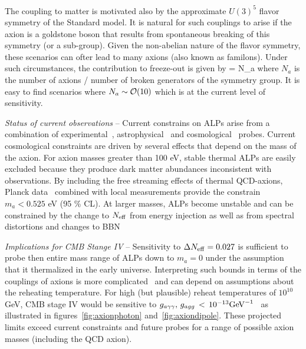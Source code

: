 The coupling to matter is motivated also by the approximate $U(3)^5$ flavor symmetry of the Standard model.  It is natural for such couplings to arise if the axion is a goldstone boson that results from spontaneous breaking of this symmetry (or a sub-group).  Given the non-abelian nature of the flavor symmetry, these scenarios can ofter lead to many axions (also known as familons).  Under such circumstances, the contribution to freeze-out is given by 
\beq
\Delta \Neff = N_a 
\eeq
where $N_a$ is the number of axions / number of broken generators of the symmetry group.  It is easy to find scenarios where $N_a\sim {\cal O}(10)$ which is at the current level of sensitivity.


{\it Status of current observations} -- Current constrains on ALPs arise from a combination of experimental~\cite{Graham:2015ouw}, astrophysical~\cite{Raffelt:2012kt} and cosmological~\cite{Marsh:2015xka} probes.  Current cosmological constraints are driven by several effects that depend on the mass of the axion.  For axion masses greater than 100 eV, stable thermal ALPs are easily excluded because they produce dark matter abundances inconsistent with observations.  By including the free streaming effects of thermal QCD-axions,  Planck data~\cite{DiValentino:2015wba} combined with local measurements provide the constrain $m_a < 0.525$ eV (95 \% CL).  At larger masses, ALPs become unstable and can be constrained by the change to $N_{\rm eff}$ from energy injection as well as from spectral distortions and changes to BBN~\cite{Cadamuro:2011fd,Follin:2015hya}

{\it Implications for CMB Stange IV} -- Sensitivity to $\Delta N_{\rm eff} =0.027$ is sufficient to probe then entire mass range of ALPs down to $m_a =0$ under the assumption that it thermalized in the early universe.  Interpreting such bounds in terms of the couplings of axions is more complicated~\cite{Brust:2013xpv} and can depend on assumptions about the reheating temperature.  For high (but plausible) reheat temperatures of $10^{10}$ GeV, CMB stage IV would be sensitive to $g_{a\gamma \gamma}, \, g_{a g g} \,  < \, 10^{-13} {\rm GeV}^{-1}$~\cite{Baumann:2016wac} as illustrated in figures~\ref{fig:axionphoton} and~\ref{fig:axiondipole}.  These projected limits exceed current constraints and future probes for a range of possible axion masses (including the QCD axion).

